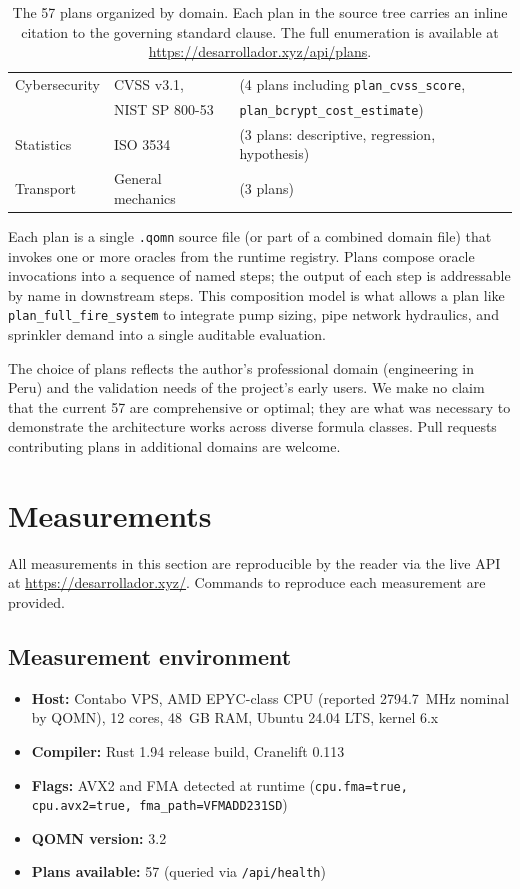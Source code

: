 \documentclass[11pt,a4paper]{article}
\begin{document}
\begin{table}[h]
\begin{tabular}{lll}
\addlinespace
Cybersecurity   & CVSS v3.1,            & (4 plans including \texttt{plan\_cvss\_score}, \\
                & NIST SP 800-53        & \texttt{plan\_bcrypt\_cost\_estimate}) \\
\addlinespace
Statistics      & ISO 3534              & (3 plans: descriptive, regression, hypothesis) \\
\addlinespace
Transport       & General mechanics     & (3 plans) \\
\bottomrule
\end{tabular}
\caption{The 57 plans organized by domain. Each plan in the source tree carries an inline citation to the governing standard clause. The full enumeration is available at \url{https://desarrollador.xyz/api/plans}.}
\label{tab:stdlib}
\end{table}

Each plan is a single \texttt{.qomn} source file (or part of a combined domain file) that invokes one or more oracles from the runtime registry. Plans compose oracle invocations into a sequence of named steps; the output of each step is addressable by name in downstream steps. This composition model is what allows a plan like \texttt{plan\_full\_fire\_system} to integrate pump sizing, pipe network hydraulics, and sprinkler demand into a single auditable evaluation.

The choice of plans reflects the author's professional domain (engineering in Peru) and the validation needs of the project's early users. We make no claim that the current 57 are comprehensive or optimal; they are what was necessary to demonstrate the architecture works across diverse formula classes. Pull requests contributing plans in additional domains are welcome.

\section{Measurements}
\label{sec:measurements}

All measurements in this section are reproducible by the reader via the live API at \url{https://desarrollador.xyz/}. Commands to reproduce each measurement are provided.

\subsection{Measurement environment}

\begin{itemize}[leftmargin=*]
\item \textbf{Host:} Contabo VPS, AMD EPYC-class CPU (reported 2794.7~MHz nominal by QOMN), 12 cores, 48~GB RAM, Ubuntu 24.04 LTS, kernel 6.x
\item \textbf{Compiler:} Rust 1.94 release build, Cranelift 0.113
\item \textbf{Flags:} AVX2 and FMA detected at runtime (\texttt{cpu.fma=true, cpu.avx2=true, fma\_path=VFMADD231SD})
\item \textbf{QOMN version:} 3.2
\item \textbf{Plans available:} 57 (queried via \texttt{/api/health})
\end{itemize}
\end{document}
